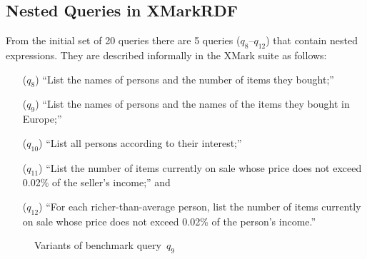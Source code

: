 
\subsection{Nested Queries in XMarkRDF}
\label{sec:optim-xmarkrdf-nest}


From the initial set of 20 queries there are 5 queries ($q_8$--$q_{12}$) that contain nested expressions. They are
described informally in the XMark suite as follows:
\begin{enumerate}[noitemsep]
\item[($q_8$)] ``List the names of persons and the number of items they bought;''
\item[($q_9$)] ``List the names of persons and the names of the items they bought in Europe;''
\item[($q_{10}$)] ``List all persons according to their interest;''
\item[($q_{11}$)] ``List the number of items currently on sale whose price does not exceed 0.02\% of the seller's
  income;'' and
\item[($q_{12}$)] ``For each richer-than-average person, list the number of items currently on sale whose price does not
  exceed 0.02\% of the person's income.''
\end{enumerate}



\begin{figure}[t]
%
\hfill
%
%

%
%
\hfill
%
%
\caption{Variants of benchmark query~$q_9$}
\label{fig:query09}
\end{figure}
%

